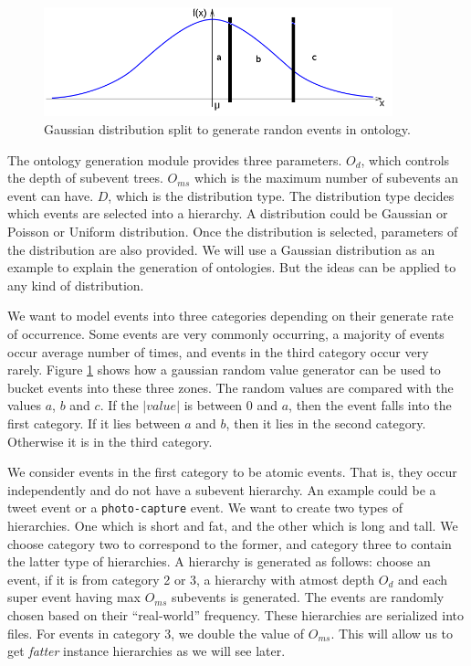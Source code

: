 \begin{figure}[t]
\centering
\includegraphics[width=0.9\textwidth]{media/chapter5/perf/gaussian-split.png}
\caption{Gaussian distribution split to generate randon events in ontology.}
\label{fig:gaussian-split}
\end{figure}


The ontology generation module provides three parameters. $O_d$, which controls the depth of subevent trees. $O_{ms}$ which is the maximum number of subevents an event can have. $D$, which is the distribution type. The distribution type decides which events are selected into a hierarchy. A distribution could be Gaussian or Poisson or Uniform distribution. Once the distribution is selected, parameters of the distribution are also provided. We will use a Gaussian distribution as an example to explain the generation of ontologies. But the ideas can be applied to any kind of distribution. 

We want to model events into three categories depending on their generate rate of occurrence. Some events are very commonly occurring, a majority of events occur average number of times, and events in the third category occur very rarely. Figure \ref{fig:gaussian-split} shows how a gaussian random value generator can be used to bucket events into these three zones. The random values are compared with the values $a$, $b$ and $c$. If the $|value|$ is between 0 and $a$, then the event falls into the first category. If it lies between $a$ and $b$, then it lies in the second category. Otherwise it is in the third category.

We consider events in the first category to be atomic events. That is, they occur independently and do not have a subevent hierarchy. An example could be a tweet event or a \texttt{photo-capture} event. We want to create two types of hierarchies. One which is short and fat, and the other which is long and tall. We choose category two to correspond to the former, and category three to contain the latter type of hierarchies. A hierarchy is generated as follows: choose an event, if it is from category 2 or 3, a hierarchy with atmost depth $O_d$ and each super event having max $O_{ms}$ subevents is generated. The events are randomly chosen based on their ``real-world'' frequency. These hierarchies are serialized into files. For events in category 3, we double the value of $O_{ms}$. This will allow us to get \textit{fatter} instance hierarchies as we will see later.

